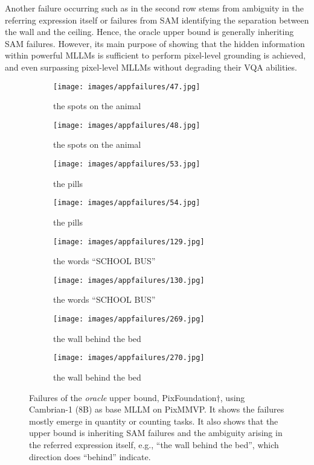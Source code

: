 Another failure occurring such as in the second row stems from ambiguity in the referring expression itself or failures from SAM identifying the separation between the wall and the ceiling. Hence, the oracle upper bound is generally inheriting SAM failures. However, its main purpose of showing that the hidden information within powerful MLLMs is sufficient to perform pixel-level grounding is achieved, and even surpassing pixel-level MLLMs without degrading their VQA abilities.

\begin{figure*}[t]
\centering
\begin{subfigure}{0.24\textwidth}
\texttt{[image: images/appfailures/47.jpg]}
\captionsetup{labelformat=empty}
\caption{\tiny{the spots on the animal}}
\end{subfigure}%
\begin{subfigure}{0.24\textwidth}
\texttt{[image: images/appfailures/48.jpg]}
\captionsetup{labelformat=empty}
\caption{\tiny{the spots on the animal}}
\end{subfigure}%
\begin{subfigure}{0.24\textwidth}
\texttt{[image: images/appfailures/53.jpg]}
\captionsetup{labelformat=empty}
\caption{\tiny{the pills}}
\end{subfigure}%
\begin{subfigure}{0.24\textwidth}
\texttt{[image: images/appfailures/54.jpg]}
\captionsetup{labelformat=empty}
\caption{\tiny{the pills}}
\end{subfigure}

\begin{subfigure}{0.24\textwidth}
\texttt{[image: images/appfailures/129.jpg]}
\captionsetup{labelformat=empty}
\caption{\tiny{the words ``SCHOOL BUS''}}
\end{subfigure}%
\begin{subfigure}{0.24\textwidth}
\texttt{[image: images/appfailures/130.jpg]}
\captionsetup{labelformat=empty}
\caption{\tiny{the words ``SCHOOL BUS''}}
\end{subfigure}%
\begin{subfigure}{0.24\textwidth}
\texttt{[image: images/appfailures/269.jpg]}
\captionsetup{labelformat=empty}
\caption{\tiny{the wall behind the bed}}
\end{subfigure}%
\begin{subfigure}{0.24\textwidth}
\texttt{[image: images/appfailures/270.jpg]}
\captionsetup{labelformat=empty}
\caption{\tiny{the wall behind the bed}}
\end{subfigure}
\caption{Failures of the \textit{oracle} upper bound, PixFoundation$\dagger$, using Cambrian-1 (8B) as base MLLM on PixMMVP. It shows the failures mostly emerge in quantity or counting tasks. It also shows that the upper bound is inheriting SAM failures and the ambiguity arising in the referred expression itself, e.g., ``the wall behind the bed'', which direction does ``behind'' indicate.}
\label{fig:failures}
\end{figure*}

